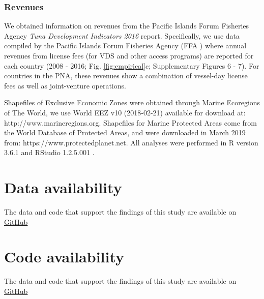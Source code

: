\documentclass[12pt]{article}
\begin{document}
\subsubsection{Revenues}

We obtained information on revenues from the Pacific Islands Forum Fisheries Agency \emph{Tuna Development Indicators 2016} report.  Specifically, we use data compiled by the Pacific Islands Forum Fisheries Agency (FFA \cite{ffa_2017}) where annual revenues from license fees (for VDS and other access programs) are reported for each country (2008 - 2016; Fig. \ref{fig:empirical}c; Supplementary Figures 6 - 7). For countries in the PNA, these revenues show a combination of vessel-day license fees as well as joint-venture operations.

Shapefiles of Exclusive Economic Zones were obtained through Marine Ecoregions of The World, we use World EEZ v10 (2018-02-21) available for download at: http://www.marineregions.org. Shapefiles for Marine Protected Areas come from the World Database of Protected Areas, and were downloaded in March 2019 from: https://www.protectedplanet.net. All analyses were performed in R version 3.6.1 and RStudio 1.2.5.001 \cite{rcore_2019}.

\section{Data availability}

The data and code that support the findings of this study are available on \href{https://github.com/jcvdav/MPA_displacement}{GitHub}

\section{Code availability}

The data and code that support the findings of this study are available on \href{https://github.com/jcvdav/MPA_displacement}{GitHub}

%
%
\end{document}
